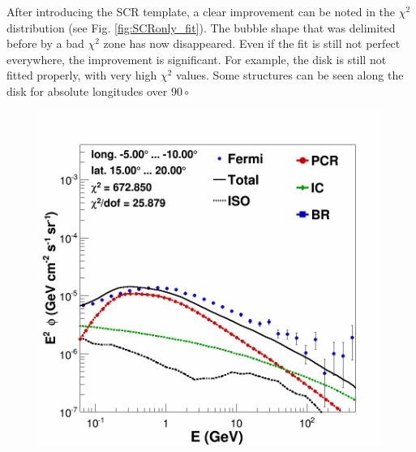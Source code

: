 \begin{figure}[h]
\begin{minipage}[h]{0.45\textwidth}
	  \label{fig:BKGonly_bubble_spec}
  \end{minipage}
  \label{fig:SCRonly_distributions}
\end{figure}


After introducing the SCR template, a clear improvement can be noted in the $\chi^2$ distribution (see Fig. \ref{fig:SCRonly_fit}). The bubble shape that was delimited before by a bad $\chi^2$ zone has now disappeared. Even if the fit is still not perfect everywhere, the improvement is significant. For example, the disk is still not fitted properly, with very high $\chi^2$ values. Some structures can be seen along the disk for absolute longitudes over $90\circ$

\begin{figure}[h]
  \centering
  \begin{minipage}[h]{0.45\textwidth}
  	\centering
	\includegraphics[width=1.\linewidth]{pic/results/bkgdonly_spectra_bubble_example.png}
  	\label{fig:SCRonly_bubble_spec}
  \end{minipage}
  \hfill
  \begin{minipage}[h]{0.45\textwidth}
	  \centering

\end{minipage}
\end{figure}
